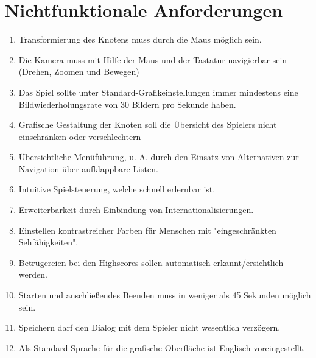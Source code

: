 \chapter{Nichtfunktionale Anforderungen}

\renewcommand{\theenumi}{/NF\_\arabic{enumi}0/}
\renewcommand{\labelenumi}{\theenumi}

\begin{enumerate}

\item Transformierung des Knotens muss durch die Maus möglich sein.
\item Die Kamera muss mit Hilfe der Maus und der Tastatur navigierbar sein (Drehen, Zoomen und Bewegen)
\item Das Spiel sollte unter Standard-Grafikeinstellungen immer mindestens eine Bildwiederholungsrate von 30 Bildern pro Sekunde haben.
\item Grafische Gestaltung der Knoten soll die Übersicht des Spielers nicht einschränken oder verschlechtern  
\item Übersichtliche Menüführung, u. A. durch den Einsatz von Alternativen zur Navigation über aufklappbare Listen.
\item Intuitive Spielsteuerung, welche schnell erlernbar ist. 
\item Erweiterbarkeit durch Einbindung von Internationalisierungen. %
\item Einstellen kontrastreicher Farben für Menschen mit "eingeschränkten Sehfähigkeiten". %
\item Betrügereien bei den Highscores sollen automatisch erkannt/ersichtlich werden. %
\item Starten und anschließendes Beenden muss in weniger als 45 Sekunden möglich sein. %
\item Speichern darf den Dialog mit dem Spieler nicht wesentlich verzögern. 
\item Als Standard-Sprache für die grafische Oberfläche ist Englisch voreingestellt.

\end{enumerate}
